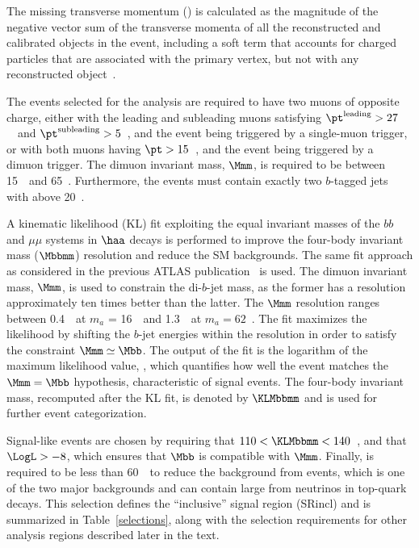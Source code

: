 \documentclass[cernpreprint, backref=false, texlive=2020, UKenglish, dvipsnames, block=none, texmf]{atlasdoc}
\begin{document}
The missing transverse momentum (\met) is calculated as the magnitude of the negative vector sum of the transverse momenta of all the reconstructed and calibrated objects in the event, including a soft term that accounts for charged particles that are associated with the primary vertex, but not with any reconstructed object~\cite{PERF-2016-07,ATLAS-CONF-2018-023}.
 
 
The events selected for the analysis are required to have two muons of opposite charge, either with the leading and subleading muons satisfying $\pt^{\text{leading}}>27$~\GeV\ and $\pt^{\text{subleading}}>5$~\GeV, and the event being triggered by a single-muon trigger, or with both muons having $\pt >15$~\GeV, and the event being triggered by a dimuon trigger. The dimuon invariant mass, $\Mmm$, is required to be between 15~\GeV\ and 65~\GeV. Furthermore, the events must contain exactly two $b$-tagged jets with \pT above 20~\GeV.
 
 
A kinematic likelihood (KL) \cite{Erdmann:2013rxa} fit exploiting the equal invariant masses of the $bb$ and $\mu\mu$ systems in $\haa$ decays  is performed to improve the four-body invariant mass ($\Mbbmm$) resolution and  reduce the SM backgrounds. The same fit approach as considered in the previous ATLAS publication~\cite{bbmm36ifb} is used.
The dimuon invariant mass, $\Mmm$, is used to constrain the di-$b$-jet mass, as the former has a resolution approximately ten times better than the latter.
The $\Mmm$ resolution ranges between 0.4~\GeV\ at $m_a$ = 16~\GeV\ and 1.3~\GeV\ at $m_a = 62$~\GeV.
The fit maximizes the likelihood by shifting the $b$-jet energies within the resolution in order to satisfy the constraint $\Mmm \simeq \Mbb$.
The output of the fit is the logarithm of the maximum likelihood value, \LogL, which quantifies how well the event matches the $\Mmm = \Mbb$ hypothesis, characteristic of signal events.
The four-body invariant mass, recomputed after the KL fit, is denoted by $\KLMbbmm$ and is used for further event categorization.
 
Signal-like events are chosen by requiring that $110 <\KLMbbmm<140$~\GeV, and that $\LogL > -8$, which ensures that $\Mbb$ is compatible with $\Mmm$.
Finally, \met is required to be less than 60~\GeV\ to reduce the background from \ttbar events, which is one of the two major backgrounds and can contain large \met from neutrinos in top-quark decays. This  selection defines the ``inclusive'' signal region (SRincl) and is summarized in Table~\ref{selections}, along with the selection requirements for other analysis regions described later in the text.
 
\end{document}
